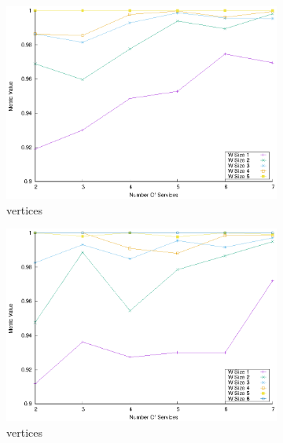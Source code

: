 \begin{figure}[!htb]
\begin{subfigure}{0.48\textwidth}
    \includegraphics[width=\textwidth]{Images/graphs/window_quality_performance_diff_qual_n7_s7_20_100_n5}
    \caption{ vertices}
    \label{fig:quality_window_average_qualitative_n5}
  \end{subfigure}
  \begin{subfigure}{0.48\textwidth}
    \includegraphics[width=\textwidth]{Images/graphs/window_quality_performance_diff_qual_n7_s7_20_100_n6}
    \caption{ vertices}
    \label{fig:quality_window_wide_qualitative_n6}
  \end{subfigure}
  \begin{subfigure}{0.48\textwidth}

\end{subfigure}
\end{figure}
